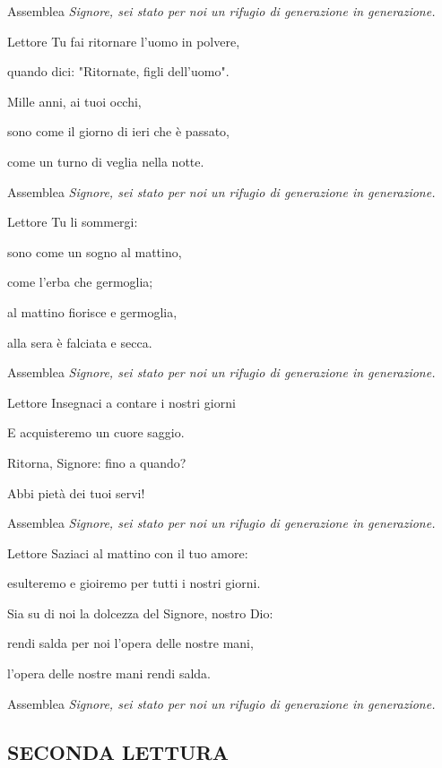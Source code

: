 \begin{dialoghi}
\item[Assemblea] \textit{Signore, sei stato per noi un rifugio di generazione in generazione.}
\item[Lettore] Tu fai ritornare l'uomo in polvere,

quando dici: "Ritornate, figli dell'uomo".

Mille anni, ai tuoi occhi,

sono come il giorno di ieri che è passato,

come un turno di veglia nella notte.
\item[Assemblea] \textit{Signore, sei stato per noi un rifugio di generazione in generazione.}
\item[Lettore] Tu li sommergi:

sono come un sogno al mattino,

come l'erba che germoglia;

al mattino fiorisce e germoglia,

alla sera è falciata e secca.
\item[Assemblea] \textit{Signore, sei stato per noi un rifugio di generazione in generazione.}
\item[Lettore] Insegnaci a contare i nostri giorni

E acquisteremo un cuore saggio.

Ritorna, Signore: fino a quando?

Abbi pietà dei tuoi servi!
\item[Assemblea] \textit{Signore, sei stato per noi un rifugio di generazione in generazione.}
\item[Lettore] Saziaci al mattino con il tuo amore:

esulteremo e gioiremo per tutti i nostri giorni.

Sia su di noi la dolcezza del Signore, nostro Dio:

rendi salda per noi l'opera delle nostre mani,

l'opera delle nostre mani rendi salda.
\item[Assemblea] \textit{Signore, sei stato per noi un rifugio di generazione in generazione.}
\end{dialoghi}

\subsection*{SECONDA LETTURA}

